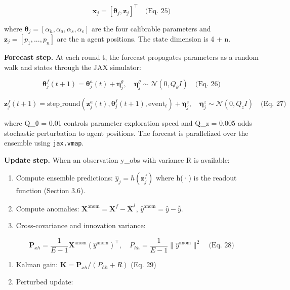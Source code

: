 \documentclass[
]{article}
\begin{document}
\[\mathbf{x}_j = [\boldsymbol{\theta}_j, \mathbf{z}_j]^\top \quad \text{(Eq. 25)}\]

where
\(\boldsymbol{\theta}_j = [\alpha_h, \alpha_a, \alpha_s, \alpha_e]\) are
the four calibrable parameters and \(\mathbf{z}_j = [p_1, ..., p_n]\)
are the n agent positions. The state dimension is 4 + n.

\textbf{Forecast step.} At each round t, the forecast propagates
parameters as a random walk and states through the JAX simulator:

\[\boldsymbol{\theta}_j^f(t+1) = \boldsymbol{\theta}_j^a(t) + \boldsymbol{\eta}_j^\theta, \quad \boldsymbol{\eta}_j^\theta \sim \mathcal{N}(0, Q_\theta I) \quad \text{(Eq. 26)}\]

\[\mathbf{z}_j^f(t+1) = \text{step\_round}(\mathbf{z}_j^a(t), \boldsymbol{\theta}_j^f(t+1), \text{event}_t) + \boldsymbol{\eta}_j^z, \quad \boldsymbol{\eta}_j^z \sim \mathcal{N}(0, Q_z I) \quad \text{(Eq. 27)}\]

where Q\_θ = 0.01 controls parameter exploration speed and Q\_z = 0.005
adds stochastic perturbation to agent positions. The forecast is
parallelized over the ensemble using \texttt{jax.vmap}.

\textbf{Update step.} When an observation y\_obs with variance R is
available:

\begin{enumerate}
\def\labelenumi{\arabic{enumi}.}
\item
  Compute ensemble predictions: \(\hat{y}_j = h(\mathbf{z}_j^f)\) where
  h(·) is the readout function (Section 3.6).
\item
  Compute anomalies:
  \(\mathbf{X}^{\text{anom}} = \mathbf{X}^f - \bar{\mathbf{X}}^f\),
  \(\hat{y}^{\text{anom}} = \hat{y} - \bar{\hat{y}}\).
\item
  Cross-covariance and innovation variance:
\end{enumerate}

\[\mathbf{P}_{xh} = \frac{1}{E-1} \mathbf{X}^{\text{anom}} (\hat{y}^{\text{anom}})^\top, \quad P_{hh} = \frac{1}{E-1} \|\hat{y}^{\text{anom}}\|^2 \quad \text{(Eq. 28)}\]

\begin{enumerate}
\def\labelenumi{\arabic{enumi}.}
\setcounter{enumi}{3}
\item
  Kalman gain: \(\mathbf{K} = \mathbf{P}_{xh} / (P_{hh} + R)\) (Eq. 29)
\item
  Perturbed update:
\end{enumerate}
\end{document}
